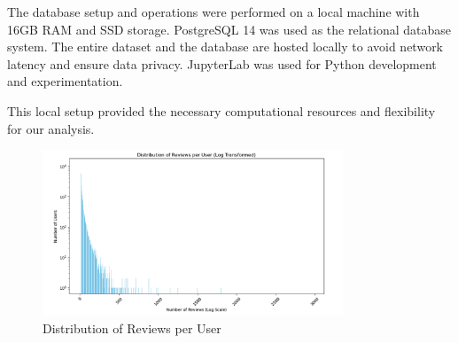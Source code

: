 \documentclass{article}
\begin{document}
The database setup and operations were performed on a local machine with 16GB RAM and SSD storage. PostgreSQL 14 was used as the relational database system. The entire dataset and the database are hosted locally to avoid network latency and ensure data privacy. JupyterLab was used for Python development and experimentation. 

This local setup provided the necessary computational resources and flexibility for our analysis.

\begin{figure}[h!]
    \centering
    \includegraphics[width=0.8\textwidth]{graph.png} %
    \caption{Distribution of Reviews per User}
    \label{fig:example} %
\end{figure}
\end{document}
